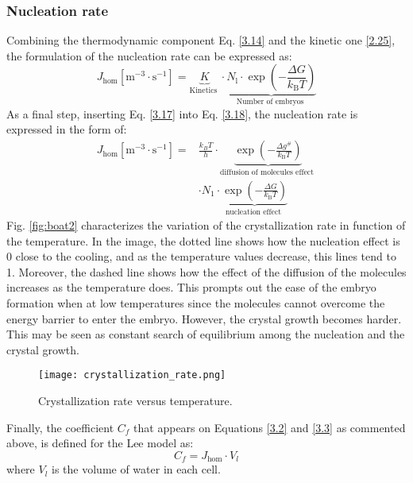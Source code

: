 \subsubsection*{Nucleation rate}
Combining the thermodynamic component Eq. \ref{3.14} and the kinetic one \ref{2.25}, the formulation of the nucleation rate can be expressed as:
\begin{equation}
	\label{2.27}
	J_{\mathrm{hom}}\left[\mathrm{m}^{-3} \cdot \mathrm{s}^{-1}\right]=\underbrace{K}_{\text {Kinetics }} \cdot \underbrace{N_{\mathrm{l}} \cdot \exp \left(-\frac{\Delta G}{k_{\mathrm{B}} T}\right)}_{\text {Number of embryos }}
\end{equation}
As a final step, inserting Eq. \ref{3.17} into Eq. \ref{3.18}, the nucleation rate is expressed in the form of:
\begin{equation}
	\label{2.28}
	\begin{aligned}
	J_{\mathrm{hom}}\left[\mathrm{m}^{-3} \cdot \mathrm{s}^{-1}\right]
	=& \frac{k_{B} T}{h} \cdot \underbrace{\exp \left(-\frac{\Delta g^{\#}}{k_{\mathrm{B}} T}\right)}_{\text {diffusion of molecules effect }} \\ 
	& \cdot N_{1} \cdot \underbrace{\exp \left(-\frac{\Delta G}{k_{\mathrm{B}} T}\right)}_{\text {nucleation effect }}
	\end{aligned}
\end{equation}
Fig. \ref{fig:boat2} characterizes the variation of the crystallization rate in function of the temperature. In the image, the dotted line shows how the nucleation effect is 0 close to the cooling, and as the temperature values decrease, this lines tend to 1. Moreover, the dashed line shows how the effect of the diffusion of the molecules increases as the temperature does. This prompts out the ease of the embryo formation when at low temperatures since the molecules cannot overcome the energy barrier to enter the embryo. However, the crystal growth becomes harder. This may be seen as constant search of equilibrium among the nucleation and the crystal growth.
\begin{figure}[h]
	\centering
	\texttt{[image: crystallization\_rate.png]}
	\caption{Crystallization rate versus temperature.}	
	\label{2.2fig}
\end{figure} 
Finally, the coefficient $C_f$ that appears on Equations \ref{3.2} and \ref{3.3} as commented above, is defined for the Lee model as:
\begin{equation}
	\label{2.29}
	C_f=J_{\mathrm{hom}} \cdot V_{l}
\end{equation}
where $V_{l}$ is the volume of water in each cell.
